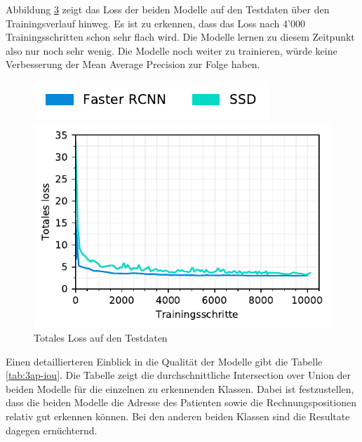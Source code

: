 \begin{figure}[H]
\begin{subfigure}[t]{0.5\linewidth}
    \label{fig:3ap-map:map_val}
    \vspace{2ex}
  \end{subfigure}
\end{figure}

Abbildung \ref{fig:3ap-map:loss} zeigt das Loss der beiden Modelle auf den Testdaten über den Trainingsverlauf hinweg. Es ist zu erkennen, dass das Loss nach 4'000 Trainingsschritten schon sehr flach wird. Die Modelle lernen zu diesem Zeitpunkt also nur noch sehr wenig. Die Modelle noch weiter zu trainieren, würde keine Verbesserung der Mean Average Precision zur Folge haben.

\begin{figure}[h!] 
    \captionsetup{width=.9\linewidth}
    \caption{Totales Loss auf den Testdaten}
    \label{fig:3ap-map:loss}
    \centering
    \includegraphics[scale=1]{graphics/matplot/img-detection__legend_1.pdf}
    
    \includegraphics[scale=1]{graphics/matplot/img-detection__all__loss.pdf}
\end{figure}

Einen detaillierteren Einblick in die Qualität der Modelle gibt die Tabelle \ref{tab:3ap-iou}. Die Tabelle zeigt die durchschnittliche Intersection over Union der beiden Modelle für die einzelnen zu erkennenden Klassen. Dabei ist festzustellen, dass die beiden Modelle die Adresse des Patienten sowie die Rechnungspositionen relativ gut erkennen können. Bei den anderen beiden Klassen sind die Resultate dagegen ernüchternd.

